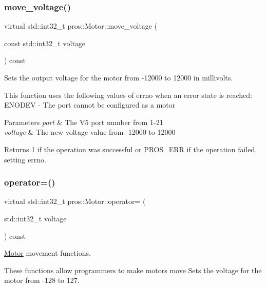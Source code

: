 \subsubsection{\texorpdfstring{move\+\_\+voltage()}{move\_voltage()}}
{\footnotesize\ttfamily virtual std\+::int32\+\_\+t pros\+::\+Motor\+::move\+\_\+voltage (\begin{DoxyParamCaption}\item[{const std\+::int32\+\_\+t}]{voltage }\end{DoxyParamCaption}) const\hspace{0.3cm}{\ttfamily [virtual]}}



Sets the output voltage for the motor from -\/12000 to 12000 in millivolts. 

This function uses the following values of errno when an error state is reached\+: E\+N\+O\+D\+EV -\/ The port cannot be configured as a motor


\begin{DoxyParams}{Parameters}
{\em port} & The V5 port number from 1-\/21 \\
\hline
{\em voltage} & The new voltage value from -\/12000 to 12000\\
\hline
\end{DoxyParams}
\begin{DoxyReturn}{Returns}
1 if the operation was successful or P\+R\+O\+S\+\_\+\+E\+RR if the operation failed, setting errno. 
\end{DoxyReturn}
\mbox{\label{classpros_1_1Motor_a4cf8a9518eb6cd268d27151f0df7fd38}} 
\subsubsection{\texorpdfstring{operator=()}{operator=()}}
{\footnotesize\ttfamily virtual std\+::int32\+\_\+t pros\+::\+Motor\+::operator= (\begin{DoxyParamCaption}\item[{std\+::int32\+\_\+t}]{voltage }\end{DoxyParamCaption}) const\hspace{0.3cm}{\ttfamily [virtual]}}



\hyperlink{classpros_1_1Motor}{Motor} movement functions. 

These functions allow programmers to make motors move Sets the voltage for the motor from -\/128 to 127.

